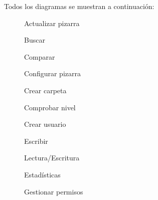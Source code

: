 Todos los diagramas se muestran a continuación: 

\vspace*{3cm}
\begin{figure}[!h]
\centering
\actualizarPizarra\label{fig:actualizarPizarra}
\caption{Actualizar pizarra}
\end{figure}
\newpage

\begin{figure}[!h]
\centering
\buscar\label{fig:buscar}
\caption{Buscar}
\end{figure}
\newpage

\begin{figure}[!h]
\centering
\comparar\label{fig:comparar}
\caption{Comparar}
\end{figure}
\newpage

\begin{figure}[!h]
\centering
\configurarPizarra\label{fig:configurarPizarra}
\caption{Configurar pizarra}
\end{figure}
\newpage

\begin{figure}[!h]
\centering
\crearCarpeta\label{fig:crearCarpeta}
\caption{Crear carpeta}
\end{figure}
\newpage

\begin{figure}[!h]
\centering
\comprobarNivel\label{fig:comprobarNivel}
\caption{Comprobar nivel}
\end{figure}
\newpage

\begin{figure}[!h]
\centering
\crearUsuario\label{fig:crearUsuario}
\caption{Crear usuario}
\end{figure}
\newpage

\begin{figure}[!h]
\centering
\escribir\label{fig:escribir}
\caption{Escribir}
\end{figure}
\newpage

\begin{figure}[!h]
\centering
\lecturaEscritura\label{fig:lecturaEscritura}
\caption{Lectura/Escritura}
\end{figure}
\newpage

\begin{figure}[!h]
\centering
\estadisticas\label{fig:estadisticas}
\caption{Estadísticas}
\end{figure}
\newpage

\begin{figure}[!h]
\centering
\gestionarPermisos\label{fig:gestionarPermisos}
\caption{Gestionar permisos}
\end{figure}
\newpage

